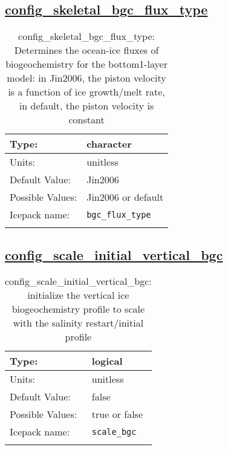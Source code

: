 \subsection[config\_skeletal\_bgc\_flux\_type]{\hyperref[sec:nm_tab_biogeochemistry]{config\_skeletal\_bgc\_flux\_type}}
\label{subsec:nm_sec_config_skeletal_bgc_flux_type}
\begin{center}
\begin{longtable}{| p{2.0in} || p{4.0in} |}
    \hline
    Type: & character \\
    \hline
    Units: & \si{unitless} \\
    \hline
    Default Value: & Jin2006 \\
    \hline
    Possible Values: & Jin2006 or default \\
    \hline
    Icepack name: & \verb+bgc_flux_type+ \\
    \hline
    \caption{config\_skeletal\_bgc\_flux\_type: Determines the ocean-ice fluxes of biogeochemistry for the bottom1-layer model: in Jin2006, the piston velocity is a function of ice growth/melt rate, in default, the piston velocity is constant}
\end{longtable}
\end{center}
\subsection[config\_scale\_initial\_vertical\_bgc]{\hyperref[sec:nm_tab_biogeochemistry]{config\_scale\_initial\_vertical\_bgc}}
\label{subsec:nm_sec_config_scale_initial_vertical_bgc}
\begin{center}
\begin{longtable}{| p{2.0in} || p{4.0in} |}
    \hline
    Type: & logical \\
    \hline
    Units: & \si{unitless} \\
    \hline
    Default Value: & false \\
    \hline
    Possible Values: & true or false \\
    \hline
    Icepack name: & \verb+scale_bgc+ \\
    \hline
    \caption{config\_scale\_initial\_vertical\_bgc: initialize the vertical ice biogeochemistry profile to scale with the salinity restart/initial profile}
\end{longtable}
\end{center}
